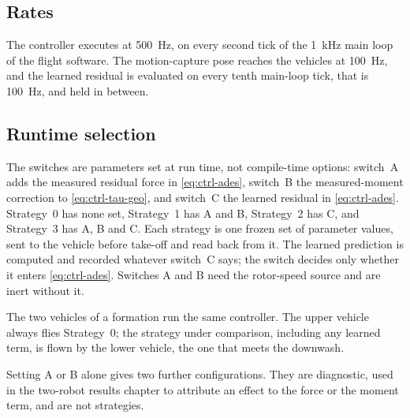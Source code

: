\subsection{Rates}

The controller executes at \SI{500}{\hertz}, on every second tick of the \SI{1}{\kilo\hertz} main
loop of the flight software. The motion-capture pose reaches the vehicles at \SI{100}{\hertz}, and
the learned residual is evaluated on every tenth main-loop tick, that is \SI{100}{\hertz}, and held
in between.

\subsection{Runtime selection}
\label{sec:ctrl-runtime}

The switches are parameters set at run time, not compile-time options: switch~A adds the measured
residual force in \eqref{eq:ctrl-ades}, switch~B the measured-moment correction to
\eqref{eq:ctrl-tau-geo}, and switch~C the learned residual in \eqref{eq:ctrl-ades}. Strategy~0 has
none set, Strategy~1 has A and B, Strategy~2 has C, and Strategy~3 has A, B and C. Each strategy
is one frozen set of parameter values, sent to the vehicle before take-off and read back from it.
The learned prediction is computed and recorded whatever switch~C says; the switch decides only
whether it enters \eqref{eq:ctrl-ades}. Switches A and B need the rotor-speed source and are inert
without it.

The two vehicles of a formation run the same controller. The upper vehicle always flies
Strategy~0; the strategy under comparison, including any learned term, is flown by the lower
vehicle, the one that meets the downwash.

Setting A or B alone gives two further configurations. They are diagnostic, used in the two-robot
results chapter to attribute an effect to the force or the moment term, and are not strategies.

